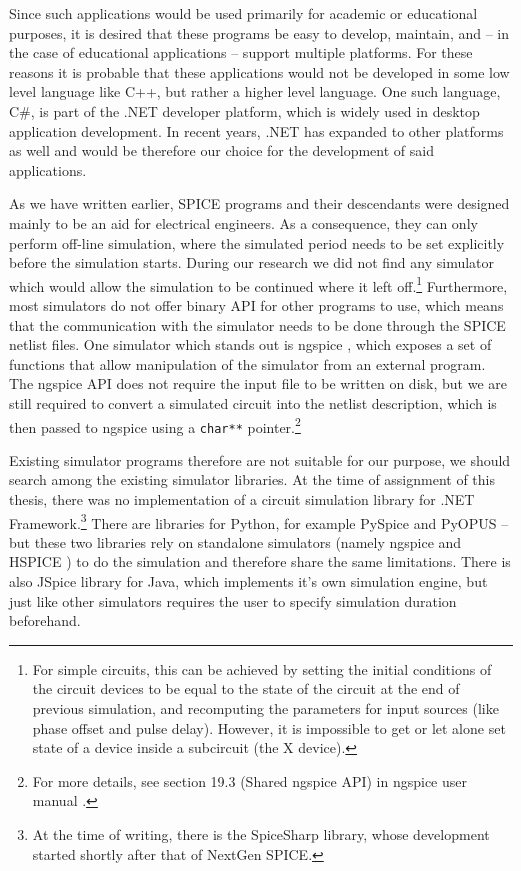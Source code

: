 Since such applications would be used primarily for academic or educational purposes, it is desired that these programs be easy to develop, maintain, and -- in the case of educational applications -- support multiple platforms. For these reasons it is probable that these applications would not be developed in some low level language like C++, but rather a higher level language. One such language, C\#, is part of the .NET developer platform, which is widely used in desktop application development. In recent years, .NET has expanded to other platforms as well and would be therefore our choice for the development of said applications.

As we have written earlier, SPICE programs and their descendants were designed mainly to be an aid for electrical engineers. As a consequence, they can only perform off-line simulation, where the simulated period needs to be set explicitly before the simulation starts. During our research we did not find any simulator which would allow the simulation to be continued where it left off.\footnote{For simple circuits, this can be achieved by setting the initial conditions of the circuit devices to be equal to the state of the circuit at the end of previous simulation, and recomputing the parameters for input sources (like phase offset and pulse delay). However, it is impossible to get or let alone set state of a device inside a subcircuit (the X device).} Furthermore, most simulators do not offer binary API for other programs to use, which means that the communication with the simulator needs to be done through the SPICE netlist files. One simulator which stands out is ngspice \cite{ngspice}, which exposes a set of functions that allow manipulation of the simulator from an external program. The ngspice API does not require the input file to be written on disk, but we are still required to convert a simulated circuit into the netlist description, which is then passed to ngspice using a \texttt{char**} pointer.\footnote{For more details, see section 19.3 (Shared ngspice API) in ngspice user manual \cite{ngspice-manual}.}

Existing simulator programs therefore are not suitable for our purpose, we should search among the existing simulator libraries. At the time of assignment of this thesis, there was no implementation of a circuit simulation library for .NET Framework.\footnote{At the time of writing, there is the SpiceSharp \cite{spicesharp} library, whose development started shortly after that of NextGen SPICE.} There are libraries for Python, for example PySpice \cite{pyspice} and PyOPUS \cite{pyopus} -- but these two libraries rely on standalone simulators (namely ngspice \cite{ngspice} and HSPICE \cite{hspice}) to do the simulation and therefore share the same limitations. There is also JSpice \cite{jspice} library for Java, which implements it's own simulation engine, but just like other simulators requires the user to specify simulation duration beforehand.

